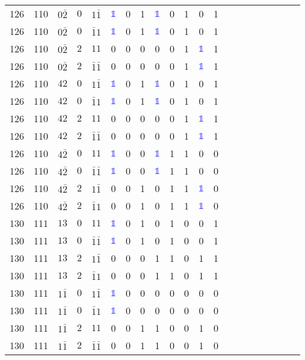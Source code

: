 \begin{longtable*}{c| cccccccccccccccccccc }
126& 110& $0\bar{2}$& $0$& $1\bar{1}$& \textcolor{blue}{$\mathds{1}$}& 0& 1& \textcolor{blue}{$\mathds{1}$}& 0& 1& 0& 1\\
126& 110& $0\bar{2}$& $0$& $\bar{1}1$& \textcolor{blue}{$\mathds{1}$}& 0& 1& \textcolor{blue}{$\mathds{1}$}& 0& 1& 0& 1\\
126& 110& $0\bar{2}$& $2$& $11$& 0& 0& 0& 0& 0& 1& \textcolor{blue}{$\mathds{1}$}& 1\\
126& 110& $0\bar{2}$& $2$& $\bar{1}\bar{1}$& 0& 0& 0& 0& 0& 1& \textcolor{blue}{$\mathds{1}$}& 1\\
126& 110& $42$& $0$& $1\bar{1}$& \textcolor{blue}{$\mathds{1}$}& 0& 1& \textcolor{blue}{$\mathds{1}$}& 0& 1& 0& 1\\
126& 110& $42$& $0$& $\bar{1}1$& \textcolor{blue}{$\mathds{1}$}& 0& 1& \textcolor{blue}{$\mathds{1}$}& 0& 1& 0& 1\\
126& 110& $42$& $2$& $11$& 0& 0& 0& 0& 0& 1& \textcolor{blue}{$\mathds{1}$}& 1\\
126& 110& $42$& $2$& $\bar{1}\bar{1}$& 0& 0& 0& 0& 0& 1& \textcolor{blue}{$\mathds{1}$}& 1\\
126& 110& $4\bar{2}$& $0$& $11$& \textcolor{blue}{$\mathds{1}$}& 0& 0& \textcolor{blue}{$\mathds{1}$}& 1& 1& 0& 0\\
126& 110& $4\bar{2}$& $0$& $\bar{1}\bar{1}$& \textcolor{blue}{$\mathds{1}$}& 0& 0& \textcolor{blue}{$\mathds{1}$}& 1& 1& 0& 0\\
126& 110& $4\bar{2}$& $2$& $1\bar{1}$& 0& 0& 1& 0& 1& 1& \textcolor{blue}{$\mathds{1}$}& 0\\
126& 110& $4\bar{2}$& $2$& $\bar{1}1$& 0& 0& 1& 0& 1& 1& \textcolor{blue}{$\mathds{1}$}& 0\\
130& 111& $13$& $0$& $11$& \textcolor{blue}{$\mathds{1}$}& 0& 1& 0& 1& 0& 0& 1\\
130& 111& $13$& $0$& $\bar{1}\bar{1}$& \textcolor{blue}{$\mathds{1}$}& 0& 1& 0& 1& 0& 0& 1\\
130& 111& $13$& $2$& $1\bar{1}$& 0& 0& 0& 1& 1& 0& 1& 1\\
130& 111& $13$& $2$& $\bar{1}1$& 0& 0& 0& 1& 1& 0& 1& 1\\
130& 111& $1\bar{1}$& $0$& $1\bar{1}$& \textcolor{blue}{$\mathds{1}$}& 0& 0& 0& 0& 0& 0& 0\\
130& 111& $1\bar{1}$& $0$& $\bar{1}1$& \textcolor{blue}{$\mathds{1}$}& 0& 0& 0& 0& 0& 0& 0\\
130& 111& $1\bar{1}$& $2$& $11$& 0& 0& 1& 1& 0& 0& 1& 0\\
130& 111& $1\bar{1}$& $2$& $\bar{1}\bar{1}$& 0& 0& 1& 1& 0& 0& 1& 0\\

\end{longtable*}
